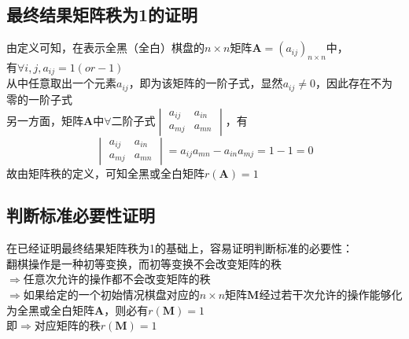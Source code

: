 \documentclass[UTF-8,a4paper]{ctexart}
\begin{document}
\subsection{最终结果矩阵秩为1的证明}
\kaishu
由定义可知，在表示全黑（全白）棋盘的\(n \times n\)矩阵\(\mathbf{A}=(a_{ij})_{n \times n}\)中，
\\有\(\forall i,j , a_{ij}=1(or -1) \)
\\从中任意取出一个元素\(a_{ij}\)，即为该矩阵的一阶子式，显然\(a_{ij} \neq 0\)，因此存在不为零的一阶子式
\\另一方面，矩阵\(\mathbf{A}\)中\(\forall\)二阶子式\(\begin{vmatrix}
    a_{ij}&a_{in}
    \\a_{mj}&a_{mn}
\end{vmatrix}\)，有
\[\begin{vmatrix}
    a_{ij}&a_{in}
    \\a_{mj}&a_{mn}
\end{vmatrix}=a_{ij}a_{mn}-a_{in}a_{mj}=1-1=0\]
故由矩阵秩的定义，可知全黑或全白矩阵\(r(\mathbf{A})=1\)


\subsection{判断标准必要性证明}
\songti 在已经证明最终结果矩阵秩为1的基础上，容易证明判断标准的必要性：
\kaishu
\\翻棋操作是一种初等变换，而初等变换不会改变矩阵的秩
\\ \(\Rightarrow\)任意次允许的操作都不会改变矩阵的秩
\\\(\Rightarrow\)如果给定的一个初始情况棋盘对应的\(n \times n\)矩阵\(\mathbf{M}\)经过若干次允许的操作能够化为全黑或全白矩阵\(\mathbf{A}\)，则必有\(r(\mathbf{M})=1\)
\\即\(\Rightarrow\)对应矩阵的秩\(r(\mathbf{M})=1\)
\end{document}
